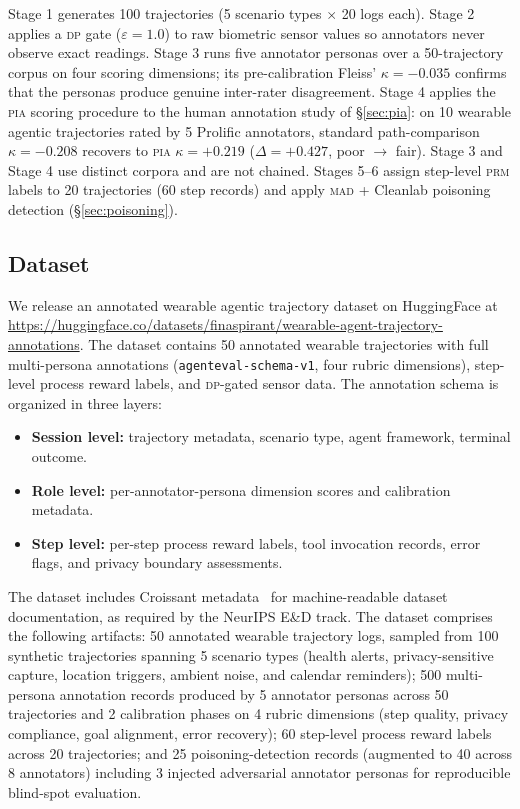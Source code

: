 \documentclass{article}
\newcommand{\PIA}{\textsc{pia}}          %
\begin{document}
Stage 1 generates 100 trajectories (5 scenario types $\times$ 20 logs each).
Stage 2 applies a \textsc{dp} gate ($\varepsilon=1.0$) to raw biometric
sensor values so annotators never observe exact readings.
Stage 3 runs five annotator personas over a 50-trajectory corpus on four
scoring dimensions; its pre-calibration Fleiss' $\kappa = -0.035$ confirms
that the personas produce genuine inter-rater disagreement.
Stage 4 applies the \PIA{} scoring procedure to the human annotation study of
\S\ref{sec:pia}: on 10 wearable agentic trajectories rated by 5 Prolific
annotators, standard path-comparison $\kappa = -0.208$ recovers to \PIA{}
$\kappa = +0.219$ ($\Delta = +0.427$, poor $\to$ fair).
Stage 3 and Stage 4 use distinct corpora and are not chained.
Stages 5--6 assign step-level \textsc{prm} labels to 20 trajectories
(60 step records) and apply \textsc{mad} + Cleanlab poisoning detection
(\S\ref{sec:poisoning}).

\subsection{Dataset}
\label{sec:agenttrace:dataset}

We release an annotated wearable agentic trajectory dataset on HuggingFace
at \url{https://huggingface.co/datasets/finaspirant/wearable-agent-trajectory-annotations}.
%
The dataset contains 50 annotated wearable trajectories with full
multi-persona annotations (\texttt{agenteval-schema-v1}, four rubric
dimensions), step-level process reward labels, and \textsc{dp}-gated
sensor data.
%
The annotation schema is organized in three layers:
\begin{itemize}[nosep]
  \item \textbf{Session level:} trajectory metadata, scenario type, agent
        framework, terminal outcome.
  \item \textbf{Role level:} per-annotator-persona dimension scores and
        calibration metadata.
  \item \textbf{Step level:} per-step process reward labels, tool invocation
        records, error flags, and privacy boundary assessments.
\end{itemize}

The dataset includes Croissant metadata~\cite{croissant2024} for
machine-readable dataset documentation, as required by the NeurIPS E\&D
track.
%
The dataset comprises the following artifacts: 50 annotated wearable
trajectory logs, sampled from 100 synthetic trajectories spanning 5 scenario
types (health alerts, privacy-sensitive capture, location triggers, ambient
noise, and calendar reminders); 500 multi-persona annotation records produced
by 5 annotator personas across 50 trajectories and 2 calibration phases on
4 rubric dimensions (step quality, privacy compliance, goal alignment, error
recovery); 60 step-level process reward labels across 20 trajectories; and
25 poisoning-detection records (augmented to 40 across 8 annotators)
including 3 injected adversarial annotator personas for reproducible
blind-spot evaluation.
\end{document}
